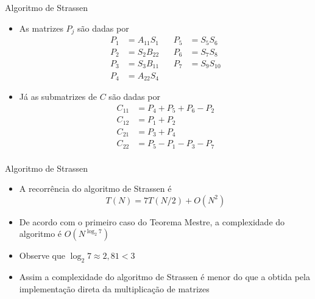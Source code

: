 \begin{frame}[fragile]{Algoritmo de Strassen}

    \begin{itemize}
        \item As matrizes $P_j$ são dadas por
        \begin{align*}
            P_1 &= A_{11}S_1 & \ \ \ \ P_5 &= S_5S_6 \\
            P_2 &= S_2B_{22} & \ \ \ \ P_6 &= S_7S_8 \\
            P_3 &= S_3B_{11} & \ \ \ \ P_7 &= S_9S_{10} \\
            P_4 &= A_{22}S_4
        \end{align*}

        \item Já as submatrizes de $C$ são dadas por
        \begin{align*}
            C_{11} &= P_4 + P_5 + P_6 - P_2 \\
            C_{12} &= P_1 + P_2 \\
            C_{21} &= P_3 + P_4 \\
            C_{22} &= P_5 - P_1 - P_3 - P_7 \\
        \end{align*}
    \end{itemize}

\end{frame}

\begin{frame}[fragile]{Algoritmo de Strassen}

    \begin{itemize}
        \item A recorrência do algoritmo de Strassen é
        \[
            T(N) = 7T(N/2) + O(N^2)
        \]

        \item De acordo com o primeiro caso do Teorema Mestre, a complexidade do algoritmo 
            é $O(N^{\log_2 7})$

        \item Observe que $\log_2 7 \approx 2,81 < 3$

        \item Assim a complexidade do algoritmo de Strassen é menor do que a obtida pela
            implementação direta da multiplicação de matrizes
    \end{itemize}

\end{frame}
